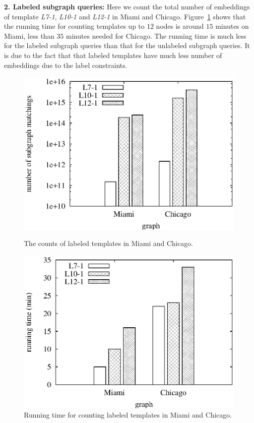 \smallskip
\textbf{2. Labeled subgraph queries:} Here we count the total number of
embeddings of template \emph{L7-1}, \emph{L10-1} and \emph{L12-1} in Miami and
Chicago. Figure~\ref{fig:label-time} shows that the running time for counting
templates up to $12$ nodes is around $15$ minutes on Miami, less than $35$
minutes needed for Chicago. The running time is much less for the labeled
subgraph queries than that for the unlabeled subgraph queries. It is due to the
fact that that labeled templates have much less number of embeddings due to the
label constraints.

\begin{figure}[htbp]
\hfill
\begin{minipage}[t]{0.45\linewidth}
\begin{center}
\centerline{\includegraphics[scale=0.35]{plots/label-count.eps}}
\caption{The counts of labeled templates in Miami and Chicago.}
\label{fig:label-count}
\end{center}
\end{minipage}
\hfill
\begin{minipage}[t]{0.45\linewidth}
\begin{center}
\centerline{\includegraphics[scale=0.35]{plots/label-time.eps}}
\caption{Running time for counting labeled templates in Miami and Chicago.}
\label{fig:label-time}
\end{center}
\end{minipage}
\hfill
\end{figure}

